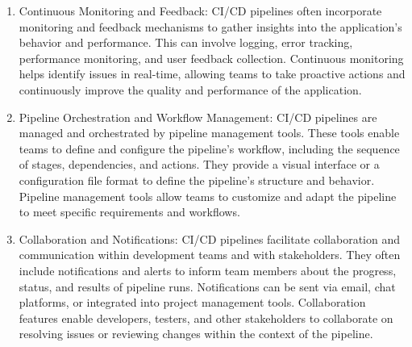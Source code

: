 \begin{enumerate}
    \item Continuous Monitoring and Feedback: CI/CD pipelines often incorporate monitoring and feedback mechanisms to gather insights into the application's behavior and performance. This can involve logging, error tracking, performance monitoring, and user feedback collection. Continuous monitoring helps identify issues in real-time, allowing teams to take proactive actions and continuously improve the quality and performance of the application.

    \item Pipeline Orchestration and Workflow Management: CI/CD pipelines are managed and orchestrated by pipeline management tools. These tools enable teams to define and configure the pipeline's workflow, including the sequence of stages, dependencies, and actions. They provide a visual interface or a configuration file format to define the pipeline's structure and behavior. Pipeline management tools allow teams to customize and adapt the pipeline to meet specific requirements and workflows.

    \item Collaboration and Notifications: CI/CD pipelines facilitate collaboration and communication within development teams and with stakeholders. They often include notifications and alerts to inform team members about the progress, status, and results of pipeline runs. Notifications can be sent via email, chat platforms, or integrated into project management tools. Collaboration features enable developers, testers, and other stakeholders to collaborate on resolving issues or reviewing changes within the context of the pipeline.
\end{enumerate}

